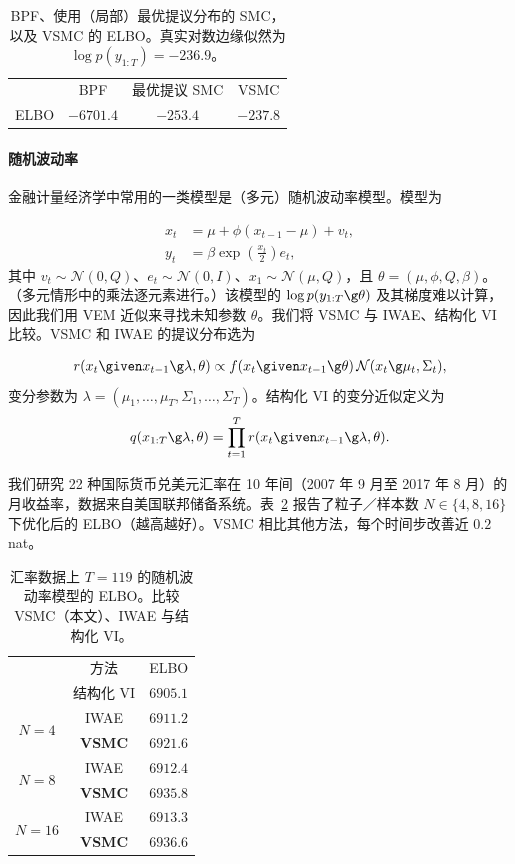 \begin{table}[tb]
\centering
\caption{BPF、使用（局部）最优提议分布的 SMC，以及 VSMC 的 ELBO。真实对数边缘似然为 $\log p(y_{1:T})=-236.9$。}

\label{tab:vsmcVSopt}
\begin{tabular}{cccc}
& BPF & 最优提议 SMC & VSMC \\
ELBO & $-6701.4$ & $-253.4$ & $\bm{-237.8}$
\end{tabular}
\end{table}

\paragraph{随机波动率}
金融计量经济学中常用的一类模型是（多元）随机波动率模型\citep{Chib2009}。模型为

\begin{align*}
x_t &= \mu +\phi(x_{t-1}-\mu)+v_t, \\
y_t &= \beta\exp{\left(\frac{x_t}{2}\right)}e_t,
\end{align*}
其中 $v_t\sim\mathcal N(0,Q)$、$e_t\sim\mathcal N(0,I)$、$x_1\sim\mathcal N(\mu,Q)$，且 $\theta=(\mu,\phi,Q,\beta)$。（多元情形中的乘法逐元素进行。）该模型的 $\log p(y_{1:T}\g\theta)$ 及其梯度难以计算，因此我们用 VEM 近似来寻找未知参数 $\theta$。我们将 VSMC 与 IWAE、结构化 VI 比较。VSMC 和 IWAE 的提议分布选为

\begin{align*}
r(x_t \given x_{t-1}\g\lambda,\theta) \propto f(x_t\given 
x_{t-1}\g\theta) \, \mathcal{N}(x_t\g \mu_t, \Sigma_t),
\end{align*}
变分参数为 $\lambda=(\mu_1,\ldots,\mu_T,\Sigma_1,\ldots,\Sigma_T)$。结构化 VI 的变分近似定义为\[q(x_{1:T}\g\lambda,\theta)=\prod_{t=1}^T r(x_t\given x_{t-1}\g\lambda,\theta).\]

我们研究 22 种国际货币兑美元汇率在 10 年间（2007 年 9 月至 2017 年 8 月）的月收益率，数据来自美国联邦储备系统。表~\ref{tab:sv} 报告了粒子／样本数 $N\in\{4,8,16\}$ 下优化后的 ELBO（越高越好）。VSMC 相比其他方法，每个时间步改善近 $0.2$ nat。

\begin{table}[tb]
\centering
\caption{汇率数据上 $T=119$ 的随机波动率模型的 ELBO。比较 VSMC（本文）、IWAE 与结构化 VI。}

\label{tab:sv}
\begin{tabular}{ccc}
&方法 & ELBO \\
\rule{0pt}{3ex}
& 结构化 VI & $6905.1$ \\
\hline
\multirow{2}{*}{$N=4$} & IWAE & $6911.2$ \\
 & \textbf{VSMC} & $\bm{6921.6}$ \\
\hline
 \multirow{2}{*}{$N=8$} & IWAE & $6912.4$ \\
 & \textbf{VSMC} & $\bm{6935.8}$ \\
\hline
 \multirow{2}{*}{$N=16$} & IWAE & $6913.3$ \\
 & \textbf{VSMC} & $\bm{6936.6}$ \\
\end{tabular}
\end{table}

